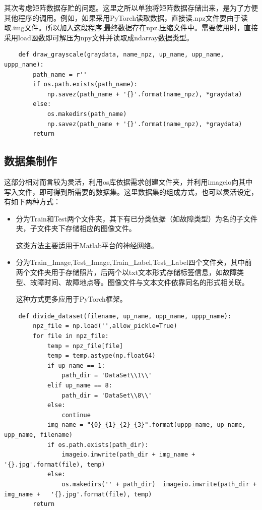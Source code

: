 \documentclass{article}
\begin{document}
	其次考虑矩阵数据存贮的问题。这里之所以单独将矩阵数据存储出来，是为了方便其他程序的调用。例如，如果采用PyTorch读取数据，直接读.npz文件要由于读取.img文件。所以加入这段程序,最终数据存在npz.压缩文件中。需要使用时，直接采用load函数即可解压为npy文件并读取成ndarray数据类型。
	\begin{lstlisting}
	def draw_grayscale(graydata, name_npz, up_name, upp_name, uppp_name):
		path_name = r''
		if os.path.exists(path_name):
			np.savez(path_name + '{}'.format(name_npz), *graydata)
		else:
			os.makedirs(path_name)
			np.savez(path_name + '{}'.format(name_npz), *graydata)
		return
	\end{lstlisting}
	
	\subsection{数据集制作}
	
	这部分相对而言较为灵活，利用os库依据需求创建文件夹，并利用imageio向其中写入文件，即可得到所需要的数据集。这里数据集的组成方式，也可以灵活设定，有如下两种方式：
	\begin{itemize}
		\item 分为Train和Test两个文件夹，其下有已分类依据（如故障类型）为名的子文件夹，子文件夹下存储相应的图像文件。
		
		这类方法主要适用于Matlab平台的神经网络。
		
		\item 分为Train\_Image,Test\_Image,Train\_Label,Test\_Label四个文件夹，其中前两个文件夹用于存储照片，后两个以txt文本形式存储标签信息，如故障类型、故障时间、故障地点等。图像文件与文本文件依靠同名的形式相关联。
		
		这种方式更多应用于PyTorch框架。
	\end{itemize}
	
	\begin{lstlisting}
	def divide_dataset(filename, up_name, upp_name, uppp_name):
		npz_file = np.load('',allow_pickle=True)
		for file in npz_file:
			temp = npz_file[file]
			temp = temp.astype(np.float64)
			if up_name == 1:
				path_dir = 'DataSet\\1\\'
			elif up_name == 8:
				path_dir = 'DataSet\\8\\'
			else:
				continue
			img_name = "{0}_{1}_{2}_{3}".format(uppp_name, up_name, upp_name, filename)
			if os.path.exists(path_dir):
				imageio.imwrite(path_dir + img_name + '{}.jpg'.format(file), temp)
			else:
				os.makedirs('' + path_dir)	imageio.imwrite(path_dir + img_name +	'{}.jpg'.format(file), temp)
		return
	\end{lstlisting}
	
\end{document}
